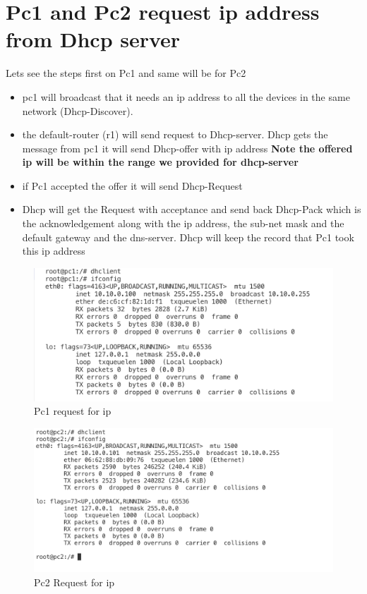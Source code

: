 \section{Pc1 and Pc2 request ip address from Dhcp server}
Lets see the steps first on Pc1 and same will be for Pc2
\begin{itemize}
  \item pc1 will broadcast that it needs an ip address to all the devices in the same network (Dhcp-Discover).
  \item the default-router (r1) will send request to Dhcp-server. Dhcp gets the message from pc1 it will send Dhcp-offer with ip address \textbf{Note the offered ip will be within the range we provided for dhcp-server} 
  \item if Pc1 accepted the offer it will send Dhcp-Request
  \item Dhcp will get the Request with acceptance and send back Dhcp-Pack which is the acknowledgement along with the ip address, the sub-net mask and the default gateway and the dns-server. Dhcp will keep the record that Pc1 took this ip address

\end{itemize}


\begin{figure}[H]
\centering
  \includegraphics[width=400pt]{Images/pc1DhcpReq.png}
  \caption{Pc1 request for ip}
  \label{fig:3.3}
\end{figure}

\begin{figure}[H]
\centering
  \includegraphics[width=400pt]{Images/pc2DhcpReq.png}
  \caption{Pc2 Request for ip}
  \label{fig:3.4}
\end{figure}


